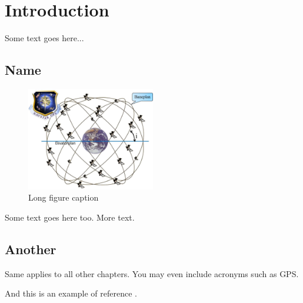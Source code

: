 \chapter{Introduction} 

Some text goes here...

\section{Name}

\begin{figure}[ht!]
  \centering
  \includegraphics[width=0.5\textwidth]{media/standard_compressed_Bilde1.jpg}
  \caption[Short figure caption]{Long figure caption}
  \label{fig:cbm_intended_feature_relevance_diagram}
\end{figure}

Some text goes here too. More text.

\section{Another}

Same applies to all other chapters. You may even include acronyms such as \ac{GPS}.

And this is an example of reference \cite{shehory_methods_1998}.